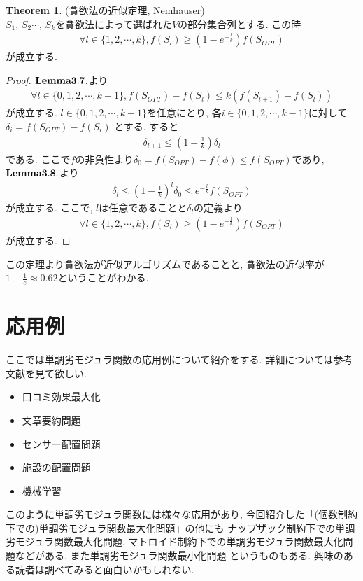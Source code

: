 \documentclass[11pt, a4paper, dvipdfmx]{jsarticle}
\theoremstyle{definition}
\newtheorem{Theorem+}[Axiom+]{Theorem}
\begin{document}
\begin{Theorem+}(貪欲法の近似定理, Nemhauser)\\
    $S_{1}$, $S_{2}$$\cdots$, $S_{k}$を貪欲法によって選ばれた$V$の部分集合列とする. この時
    \begin{align*}
        \forall l\in\{1, 2, \cdots, k\}, f(S_{l}) \geq\left (1 - e^{-\frac{l}{k}}\right)f(S_{OPT})
    \end{align*}
    が成立する. 
    \begin{proof}
        ${\bf Lemma 3.7.}$より
        \begin{align*}
            \forall l\in\{0, 1, 2, \cdots, k - 1\}, f(S_{OPT}) - f(S_{l})\leq k(f(S_{l+1}) - f(S_{l}))  
        \end{align*}
        が成立する. $l\in\{0, 1, 2, \cdots, k - 1\}$を任意にとり, 各$i\in\{0, 1, 2, \cdots, k - 1\}$に対して$\delta_{i} = f(S_{OPT}) - f(S_{i})$ とする. すると
        \begin{align*}
            \delta_{l+1}\leq\left(1 - \frac{1}{k}\right)\delta_{l}
        \end{align*}
        である. ここで$f$の非負性より$\delta_{0} = f(S_{OPT}) - f(\phi)\leq f(S_{OPT})$であり, ${\bf Lemma 3.8.}$より
        \begin{align*}
            \delta_{l}\leq \left(1 - \frac{1}{k}\right)^{l}\delta_{0}\leq e^{-\frac{l}{k}}f(S_{OPT})
        \end{align*}
        が成立する. ここで, $l$は任意であることと$\delta_{l}$の定義より
        \begin{align*}
            \forall l\in\{1, 2, \cdots, k\}, f(S_{l}) \geq\left (1 - e^{-\frac{l}{k}}\right)f(S_{OPT})
        \end{align*}
        が成立する.
    \end{proof}
\end{Theorem+}
この定理より貪欲法が近似アルゴリズムであることと, 貪欲法の近似率が $1 - \frac{1}{e} \approx 0.62$ということがわかる.
\section{応用例}
ここでは単調劣モジュラ関数の応用例について紹介をする. 詳細については参考文献を見て欲しい.
\begin{itemize}
    \item 口コミ効果最大化
    \item 文章要約問題
    \item センサー配置問題
    \item 施設の配置問題
    \item 機械学習
\end{itemize}
このように単調劣モジュラ関数には様々な応用があり, 今回紹介した「(個数制約下での)単調劣モジュラ関数最大化問題」の他にも
ナップザック制約下での単調劣モジュラ関数最大化問題, マトロイド制約下での単調劣モジュラ関数最大化問題などがある. また単調劣モジュラ関数最小化問題
というものもある. 興味のある読者は調べてみると面白いかもしれない.
\end{document}
